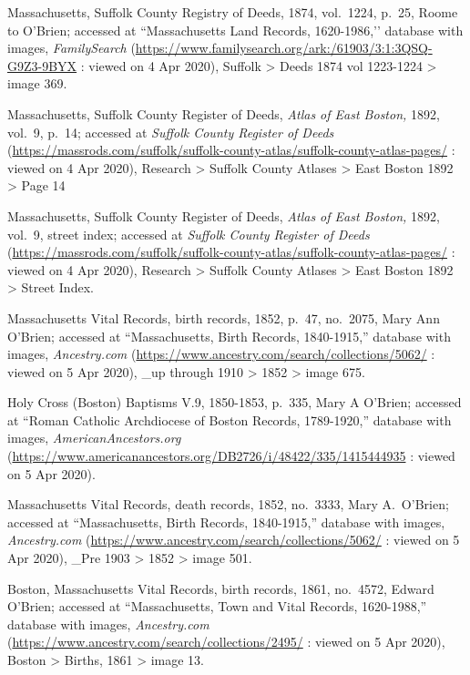 \begin{thebibliography}{999}
	Massachusetts, Suffolk County Registry of Deeds, 1874, vol.\ 1224, p.\ 25, Roome to O’Brien; accessed at ``Massachusetts Land Records, 1620-1986,’’ database with images, \textit{FamilySearch} (\url{https://www.familysearch.org/ark:/61903/3:1:3QSQ-G9Z3-9BYX} : viewed on 4 Apr 2020), Suffolk > Deeds 1874 vol 1223-1224 > image 369.
	
	Massachusetts, Suffolk County Register of Deeds, \textit{Atlas of East Boston,} 1892, vol.\ 9, p.\ 14; accessed at \textit{Suffolk County Register of Deeds} (\url{https://massrods.com/suffolk/suffolk-county-atlas/suffolk-county-atlas-pages/} : viewed on 4 Apr 2020), Research > Suffolk County Atlases > East Boston 1892 > Page 14
	
	Massachusetts, Suffolk County Register of Deeds, \textit{Atlas of East Boston,} 1892, vol.\ 9, street index; accessed at \textit{Suffolk County Register of Deeds} (\url{https://massrods.com/suffolk/suffolk-county-atlas/suffolk-county-atlas-pages/} : viewed on 4 Apr 2020), Research > Suffolk County Atlases > East Boston 1892 > Street Index.
	
	Massachusetts Vital Records, birth records, 1852, p.\ 47, no.\ 2075, Mary Ann O'Brien; accessed at ``Massachusetts, Birth Records, 1840-1915,'' database with images, \textit{Ancestry.com} (\url{https://www.ancestry.com/search/collections/5062/} : viewed on 5 Apr 2020), \_up through 1910 > 1852 > image 675.
	
	Holy Cross (Boston) Baptisms V.9, 1850-1853, p.\ 335, Mary A O'Brien; accessed at ``Roman Catholic Archdiocese of Boston Records, 1789-1920,'' database with images, \textit{AmericanAncestors.org} (\url{https://www.americanancestors.org/DB2726/i/48422/335/1415444935} : viewed on 5 Apr 2020).
	
	Massachusetts Vital Records, death records, 1852, no.\ 3333, Mary A.\ O'Brien; accessed at ``Massachusetts, Birth Records, 1840-1915,'' database with images, \textit{Ancestry.com} (\url{https://www.ancestry.com/search/collections/5062/} : viewed on 5 Apr 2020), \_Pre 1903 > 1852 > image 501.
	
	Boston, Massachusetts Vital Records, birth records, 1861, no.\ 4572, Edward O'Brien; accessed at ``Massachusetts, Town and Vital Records, 1620-1988,'' database with images, \textit{Ancestry.com} (\url{https://www.ancestry.com/search/collections/2495/} : viewed on 5 Apr 2020), Boston > Births, 1861 > image 13.


\end{thebibliography}
